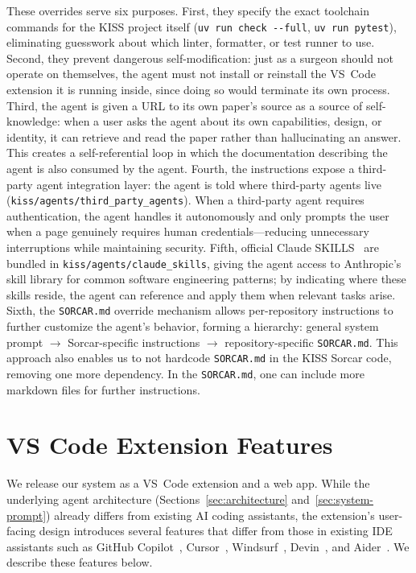 \documentclass{article}
\begin{document}
These overrides serve six purposes.  First, they specify the exact toolchain commands for the KISS project itself (\texttt{uv run check -{}-full}, \texttt{uv run pytest}), eliminating guesswork about which linter, formatter, or test runner to use.  Second, they prevent dangerous self-modification: just as a surgeon should not operate on themselves, the agent must not install or reinstall the VS~Code extension it is running inside, since doing so would terminate its own process.  Third, the agent is given a URL to its own paper's source as a source of self-knowledge: when a user asks the agent about its own capabilities, design, or identity, it can retrieve and read the paper rather than hallucinating an answer.  This creates a self-referential loop in which the documentation describing the agent is also consumed by the agent.  Fourth, the instructions expose a third-party agent integration layer: the agent is told where third-party agents live (\texttt{kiss/agents/third\_party\_agents}).  When a third-party agent requires authentication, the agent handles it autonomously and only prompts the user when a page genuinely requires human credentials---reducing unnecessary interruptions while maintaining security.  Fifth, official Claude SKILLS~\citep{claudecode2025} are bundled in \texttt{kiss/agents/claude\_skills}, giving the agent access to Anthropic's skill library for common software engineering patterns; by indicating where these skills reside, the agent can reference and apply them when relevant tasks arise.  Sixth, the \texttt{SORCAR.md} override mechanism allows per-repository instructions to further customize the agent's behavior, forming a hierarchy: general system prompt $\rightarrow$ Sorcar-specific instructions $\rightarrow$ repository-specific \texttt{SORCAR.md}.  This approach also enables us to not hardcode \texttt{SORCAR.md} in the KISS Sorcar code, removing one more dependency.  In the \texttt{SORCAR.md}, one can include more markdown files for further instructions.

\section{VS Code Extension Features}
\label{sec:vscode-features}

We release our system as a VS~Code extension and a web app.  While the underlying agent architecture (Sections~\ref{sec:architecture} and~\ref{sec:system-prompt}) already differs from existing AI coding assistants, the extension's user-facing design introduces several features that differ from those in existing IDE assistants such as GitHub Copilot~\citep{copilot2021}, Cursor~\citep{cursor2024}, Windsurf~\citep{windsurf2024}, Devin~\citep{devin2024}, and Aider~\citep{aider2023}.  We describe these features below.
\end{document}
